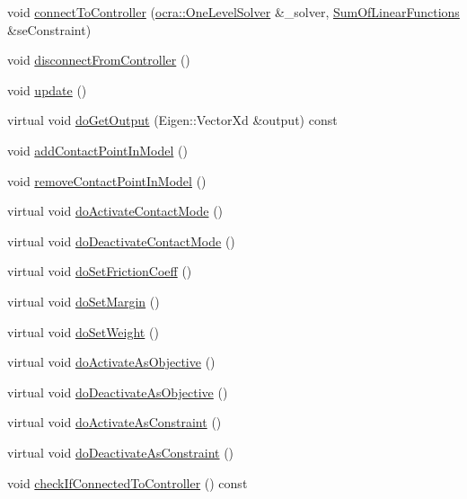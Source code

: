\begin{DoxyCompactItemize}
\item 
void \hyperlink{classgocra_1_1GHCJTTask_a021f21b19d0d9de1c067192166f852e6}{connect\+To\+Controller} (\hyperlink{classocra_1_1OneLevelSolver}{ocra\+::\+One\+Level\+Solver} \&\+\_\+solver, \hyperlink{classocra_1_1SumOfLinearFunctions}{Sum\+Of\+Linear\+Functions} \&se\+Constraint)
\item 
void \hyperlink{classgocra_1_1GHCJTTask_a5caec6472d19926a2448779fa629c9d8}{disconnect\+From\+Controller} ()
\item 
void \hyperlink{classgocra_1_1GHCJTTask_a5c2a49cb14720321fdfb91c899f87dac}{update} ()
\item 
virtual void \hyperlink{classgocra_1_1GHCJTTask_a9f2cd769e33b12a5885ecd7b78a41185}{do\+Get\+Output} (Eigen\+::\+Vector\+Xd \&output) const
\item 
void \hyperlink{classgocra_1_1GHCJTTask_aee61104908f043c77611e2b3b573d103}{add\+Contact\+Point\+In\+Model} ()
\item 
void \hyperlink{classgocra_1_1GHCJTTask_a818c6077d8325b963e3c72e41a03fe86}{remove\+Contact\+Point\+In\+Model} ()
\item 
virtual void \hyperlink{classgocra_1_1GHCJTTask_a22fe7a1bd0de44d7f51a250baf7796a8}{do\+Activate\+Contact\+Mode} ()
\item 
virtual void \hyperlink{classgocra_1_1GHCJTTask_a20b391cbb8d62237216624db57d0f634}{do\+Deactivate\+Contact\+Mode} ()
\item 
virtual void \hyperlink{classgocra_1_1GHCJTTask_ab05c45917bde9d97f166356f96ee7f95}{do\+Set\+Friction\+Coeff} ()
\item 
virtual void \hyperlink{classgocra_1_1GHCJTTask_ab2a09a00c8e1a2ffef7bd80b40aaeee1}{do\+Set\+Margin} ()
\item 
virtual void \hyperlink{classgocra_1_1GHCJTTask_a4966871ab447bff90495c057725e7122}{do\+Set\+Weight} ()
\item 
virtual void \hyperlink{classgocra_1_1GHCJTTask_a81a6df22509e5e98902e5ac33a43dfed}{do\+Activate\+As\+Objective} ()
\item 
virtual void \hyperlink{classgocra_1_1GHCJTTask_a65593378b928021c5506e2eb6dc9a9c5}{do\+Deactivate\+As\+Objective} ()
\item 
virtual void \hyperlink{classgocra_1_1GHCJTTask_a3fbf21222cf652bb5563b72416a97cda}{do\+Activate\+As\+Constraint} ()
\item 
virtual void \hyperlink{classgocra_1_1GHCJTTask_a2274fda92c62d88a6b4b35286606c41c}{do\+Deactivate\+As\+Constraint} ()
\item 
void \hyperlink{classgocra_1_1GHCJTTask_a70e6514d810197ee94af36959061982e}{check\+If\+Connected\+To\+Controller} () const
\end{DoxyCompactItemize}
